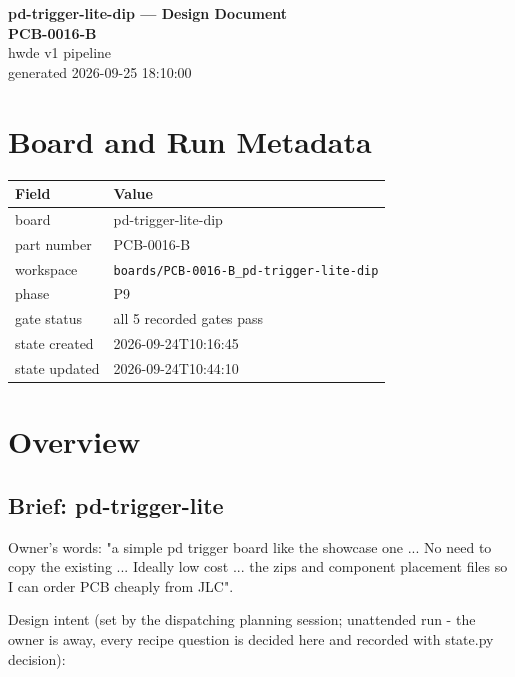 \documentclass[11pt,a4paper]{article}
\begin{document}
\sloppy
\begin{center}
{\LARGE\bfseries pd-trigger-lite-dip --- Design Document}\\[6pt]
{\Large\bfseries PCB-0016-B}\\[6pt]
{\large hwde v1 pipeline}\\[2pt]
generated 2026-09-25 18:10:00
\end{center}
\tableofcontents

\section{Board and Run Metadata}
{\small
\begin{longtable}{lp{11cm}}
\toprule
\textbf{Field} & \textbf{Value} \\
\midrule
\endhead
board & pd-trigger-lite-dip \\
part number & PCB-0016-B \\
workspace & \texttt{boards/PCB-0016-B\_pd-trigger-lite-dip} \\
phase & P9 \\
gate status & all 5 recorded gates pass \\
state created & 2026-09-24T10:16:45 \\
state updated & 2026-09-24T10:44:10 \\
\bottomrule
\end{longtable}
}
\section{Overview}
\subsection*{Brief: pd-trigger-lite}
Owner's words: "a simple pd trigger board like the showcase one ... No need to copy the existing ... Ideally low cost ... the zips and component placement files so I can order PCB cheaply from JLC".

Design intent (set by the dispatching planning session; unattended run - the owner is away, every recipe question is decided here and recorded with state.py decision):
\end{document}
